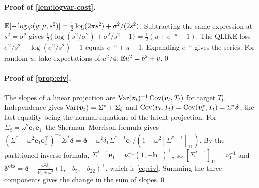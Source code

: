 \paragraph{Proof of \cref{lem:logvar-cost}.}
$\mathbb{E}[-\log\varphi(y;\mu,s^2)]=\tfrac12\log(2\pi s^2)+\sigma^2/(2s^2)$. Subtracting the same expression
at $s^2=\sigma^2$ gives $\tfrac12\{\log(s^2/\sigma^2)+\sigma^2/s^2-1\}=\tfrac12(u+e^{-u}-1)$. The QLIKE
loss $\sigma^2/s^2-\log(\sigma^2/s^2)-1$ equals $e^{-u}+u-1$. Expanding $e^{-u}$ gives the series.
For random $u$, take expectations of $u^2/4$: $\mathbb{E} u^2=b^2+v$.\qed

\paragraph{Proof of \cref{prop:eiv}.}
The slopes of a linear projection are $\operatorname{Var}(\bm{v}_t)^{-1}\operatorname{Cov}(\bm{v}_t,T_t)$ for target $T_t$. Independence
gives $\operatorname{Var}(\bm{v}_t)=\Sigma^\ast+\Sigma_\xi$ and $\operatorname{Cov}(\bm{v}_t,T_t)=\operatorname{Cov}(\bm{v}^\ast_t,T_t)=\Sigma^\ast\bm\delta$,
the last equality being the normal equations of the latent projection. For
$\Sigma_\xi=\omega^2\bm e_1\bm e_1^\top$ the Sherman--Morrison formula gives
$(\Sigma^\ast+\omega^2\bm e_1\bm e_1^\top)^{-1}\Sigma^\ast\bm\delta
=\bm\delta-\omega^2\delta_1\Sigma^{\ast-1}\bm e_1/(1+\omega^2[\Sigma^{\ast-1}]_{11})$.
By the partitioned-inverse formula, $\Sigma^{\ast-1}\bm e_1=\nu_1^{-1}(1,-\bm b^\top)^\top$, so
$[\Sigma^{\ast-1}]_{11}=\nu_1^{-1}$ and
$\bm\delta^{\mathrm{obs}}=\bm\delta-\frac{\omega^2\delta_1}{\nu_1+\omega^2}(1,-b_5,-b_{22})^\top$, which is
\eqref{eq:eiv}. Summing the three components gives the change in the sum of slopes.\qed
